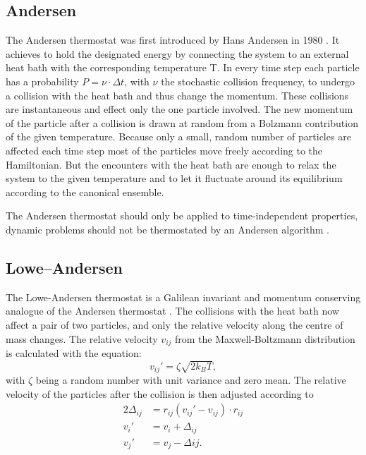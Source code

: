 \subsection{Andersen}

The Andersen thermostat was first introduced by Hans Andersen in 1980 \cite{Andersen1}.
It achieves to hold the designated energy by connecting the system to an external heat bath with the corresponding temperature T.
In every time step each particle has a probability $P=\nu\cdot\Delta t$, with $\nu$ the stochastic collision frequency, to undergo a collision with the heat bath and thus change the momentum. These collisions are instantaneous and effect only the one particle involved.
The new momentum of the particle after a collision is drawn at random from a Bolzmann contribution of the given temperature.
Because only a small, random number of particles are affected each time step most of the particles move freely according to the Hamiltonian. But the encounters with the heat bath are enough to relax the system to the given temperature and to let it fluctuate around its equilibrium according to the canonical ensemble.

The Andersen thermostat should only be applied to time-independent properties, dynamic problems should not be thermostated by an Andersen algorithm \cite{Andersen2}.

\subsection{Lowe--Andersen}
The Lowe-Andersen thermostat is a Galilean invariant and momentum conserving analogue of the Andersen thermostat \cite{LoweAndersen}.
The collisions with the heat bath now affect a pair of two particles, and only the relative velocity along the centre of mass changes. The relative velocity $v_{ij}$ from the Maxwell-Boltzmann distribution is calculated with the equation:
\begin{equation}
v_{ij}'=\zeta\sqrt{2k_BT},
\end{equation}
with $\zeta$ being a random number with unit variance and zero mean.
The relative velocity of the particles after the collision is then adjusted according to
\begin{align}
2\Delta_{ij}&=r_{ij}(v_{ij}'-v_{ij})\cdot r_{ij}\\
v_i'&=v_i+\Delta_{ij}\\
v_j'&=v_j-\Delta{ij}.\\
\end{align}
